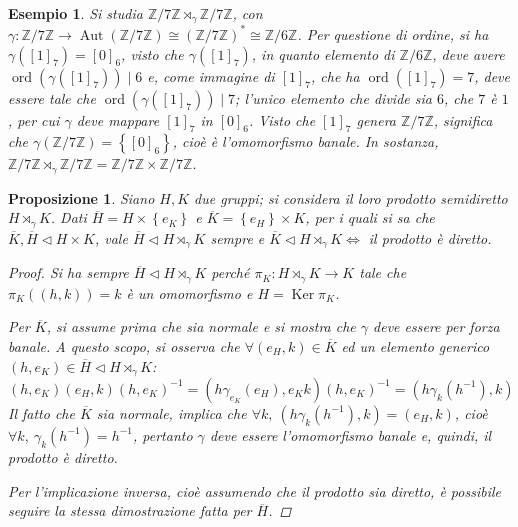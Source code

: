 \documentclass[11pt]{scrartcl}
\theoremstyle{style1}
\newtheorem{prop}{Proposizione}[section]
\newtheorem{esempio}{Esempio}[section]
\numberwithin{equation}{subsection}
\begin{document}
\begin{esempio}
Si studia $\mathbb{Z}/ 7\mathbb{Z} \rtimes _\gamma \mathbb{Z}/7\mathbb{Z}$, con $\gamma : \mathbb{Z} / 7\mathbb{Z}\to \operatorname{Aut} (\mathbb{Z}/7\mathbb{Z})\cong(\mathbb{Z}/7\mathbb{Z})^*\cong \mathbb{Z}/6\mathbb{Z}$.
Per questione di ordine, si ha $\gamma([1]_7) = [0]_6$, visto che $\gamma([1]_7)$, in quanto elemento di $\mathbb{Z}/6\mathbb{Z}$, deve avere $\operatorname{ord}(\gamma([1]_7))  \mid 6$ e, come immagine di $[1]_7$, che ha $\operatorname{ord}([1]_7) = 7$, deve essere tale che $\operatorname{ord}(\gamma([1]_7))  \mid 7$; l'unico elemento che divide sia $6$, che $7$ \`e $1$, per cui $\gamma$ deve mappare $[1]_7 $ in $[0]_6$.
Visto che $[1]_7$ genera $\mathbb{Z}/7\mathbb{Z}$, significa che $\gamma(\mathbb{Z}/7\mathbb{Z})=\left\{ [0]_6 \right\} $, cio\`e \`e l'omomorfismo banale.
In sostanza, $\mathbb{Z}/7\mathbb{Z}\rtimes _\gamma \mathbb{Z}/ 7\mathbb{Z} = \mathbb{Z}/7\mathbb{Z} \times \mathbb{Z}/7\mathbb{Z}$.
\end{esempio}
\begin{prop}
	Siano $H,K$ due gruppi; si considera il loro prodotto semidiretto $H\rtimes _\gamma K$. 
Dati $\overline{H}= H \times \left\{ e_K \right\} $ e $\overline{K}= \left\{ e_H \right\} \times K$, per i quali si sa che $\overline{K},\overline{H}\lhd H \times K$, vale $\overline{H}\lhd H \rtimes _\gamma K$ sempre e $\overline{K}\lhd H \rtimes _\gamma K \iff $ il prodotto \`e diretto.
\begin{proof}
	Si ha sempre $\overline{H}\lhd H\rtimes _\gamma K$ perch\'e $\pi_K : H \rtimes _\gamma K \to K$ tale che $\pi_K((h,k)) = k$ \`e un omomorfismo e $H = \operatorname{Ker} \pi_K$.
	
	Per $\overline{K}$, si assume prima che sia normale e si mostra che $\gamma$ deve essere per forza banale.
	A questo scopo, si osserva che $\forall (e_H, k) \in \overline{K}$ ed un elemento generico $(h,e_K) \in \overline{H}\lhd H \rtimes _\gamma K$:
	\[
		(h,e_K)(e_H,k)(h,e_K)^{-1}=(h \gamma_{e_K} (e_H), e_K k)(h,e_K)^{-1} = (h \gamma_k(h^{-1}),k)
	\] 
	Il fatto che $\overline{K}$ sia normale, implica che $\forall k, \ (h\gamma_k(h^{-1}),k)=(e_H,k)$, cio\`e $\forall k, \ \gamma_k(h^{-1}) = h^{-1}$, pertanto $\gamma$ deve essere l'omomorfismo banale e, quindi, il prodotto \`e diretto.

	Per l'implicazione inversa, cio\`e assumendo che il prodotto sia diretto, \`e possibile seguire la stessa dimostrazione fatta per $\overline{H}$.
\end{proof}
\end{prop}
\end{document}
